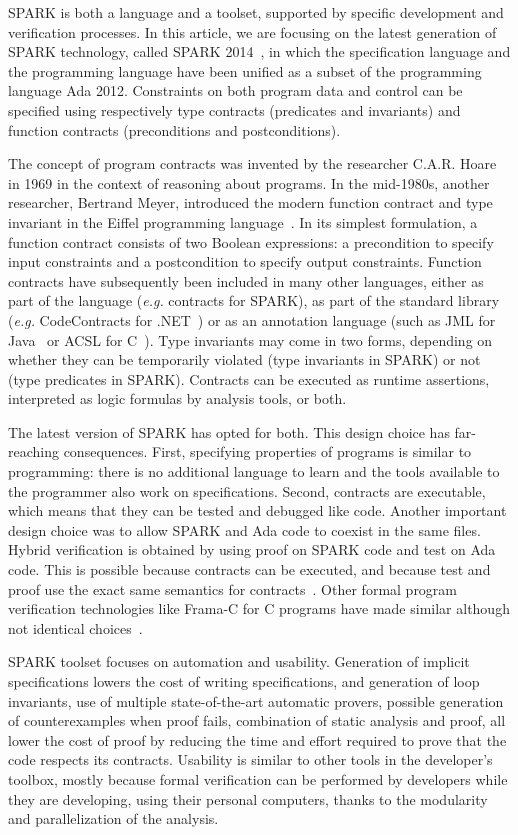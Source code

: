 \documentclass{eceasst}
\newcommand{\eg}{\textit{e.g.}\xspace}
\begin{document}
SPARK is both a language and a toolset, supported by specific development and
verification processes. In this article, we are focusing on the latest
generation of SPARK technology, called SPARK 2014~\cite{sparkERTS2014}, in
which the specification language and the programming language have been unified
as a subset of the programming language Ada 2012. Constraints on both program
data and control can be specified using respectively type contracts (predicates
and invariants) and function contracts (preconditions and
postconditions).

The concept of program contracts was invented by the researcher C.A.R. Hoare in
1969 in the context of reasoning about programs. In the mid-1980s, another
researcher, Bertrand Meyer, introduced the modern function contract and type
invariant in the Eiffel programming language~\cite{meyer:1988:OSC}.  In its
simplest formulation, a function contract consists of two Boolean expressions:
a precondition to specify input constraints and a postcondition to specify
output constraints.  Function contracts have subsequently been included in many
other languages, either as part of the language (\eg contracts for SPARK),
as part of the standard library (\eg CodeContracts for .NET~\cite{CodeContracts}) or as an annotation language
(such as JML for Java~\cite{JML} or ACSL for C~\cite{acsl}). Type invariants
may come in two forms, depending on whether they can be temporarily violated
(type invariants in SPARK) or not (type predicates in SPARK). Contracts can be
executed as runtime assertions, interpreted as logic formulas by analysis
tools, or both.

The latest version of SPARK has opted for both.
This design choice has far-reaching consequences. First, specifying properties
of programs is similar to programming: there is no additional language to learn
and the tools available to the programmer also work on specifications. Second,
contracts are executable, which means that they can be tested and debugged like
code. Another important design choice was to allow SPARK and Ada code to
coexist in the same files. Hybrid verification is obtained by using proof on
SPARK code and test on Ada code. This is possible because contracts can be
executed, and because test and proof use the exact same semantics for
contracts~\cite{tseChalin10}. Other formal program verification technologies
like Frama-C for C programs have made similar although not identical
choices~\cite{kosmatov:hal-01344110}.

SPARK toolset focuses on automation and usability. Generation of implicit
specifications lowers the cost of writing specifications, and generation of
loop invariants, use of multiple state-of-the-art automatic provers, possible
generation of counterexamples when proof fails, combination of static analysis
and proof, all lower the cost of proof by reducing the time and effort required
to prove that the code respects its contracts. Usability is similar to other
tools in the developer’s toolbox, mostly because formal verification can be
performed by developers while they are developing, using their personal
computers, thanks to the modularity and parallelization of the analysis.
\end{document}
